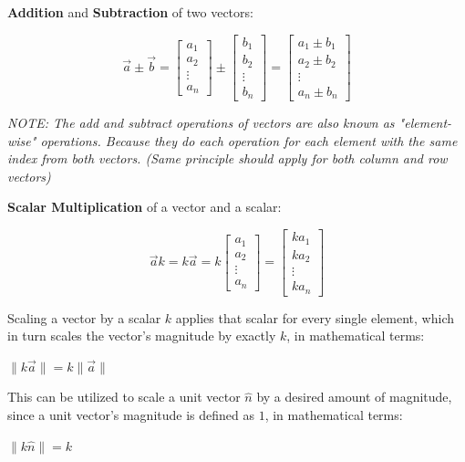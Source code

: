 \textbf{Addition} and \textbf{Subtraction} of two vectors:
\begin{center}
    \[
        {\vec{a}}\pm{\vec{b}}=\begin{bmatrix}a_1 \\ a_2 \\ \vdots \\ a_n\end{bmatrix} \pm \begin{bmatrix}b_1 \\ b_2 \\ \vdots \\ b_n\end{bmatrix}=\begin{bmatrix}a_1 \pm b_1 \\ a_2 \pm b_2 \\ \vdots \\ a_n \pm b_n\end{bmatrix}
    \]
\end{center}

\vspace{.5em}

\emph{
    NOTE: The add and subtract operations of vectors are also known as "element-wise" operations.
Because they do each operation for each element with the same index from both vectors.
(Same principle should apply for both column and row vectors)
}

\sgap

\textbf{Scalar Multiplication} of a vector and a scalar:
\begin{center}
    \[
        {\vec{a}}k=k{\vec{a}}=k \begin{bmatrix}a_1 \\ a_2 \\ \vdots \\ a_n\end{bmatrix}=\begin{bmatrix}ka_1 \\ ka_2 \\ \vdots \\ ka_n\end{bmatrix}
    \]
\end{center}

Scaling a vector by a scalar $k$ applies that scalar for every single element, which in turn scales the vector's magnitude by exactly $k$, in mathematical terms:
\begin{center}
    $\|k\vec{a}\|=k\|\vec{a}\|$
\end{center}

This can be utilized to scale a unit vector $\hat{n}$ by a desired amount of magnitude, since a unit vector's magnitude is defined as $1$, in mathematical terms:
\begin{center}
    $\|k\hat{n}\| = k$
\end{center}

